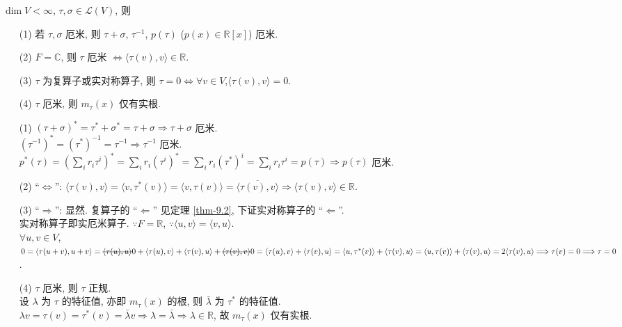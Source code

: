 \documentclass{note}
\begin{document}
\begin{thm}
    $\dim V<\infty$, $\tau,\sigma\in\mathcal{L}(V)$, 则
    \begin{itemize}
        \item[(1)] 若 $\tau,\sigma$ 厄米, 则 $\tau+\sigma$, $\tau^{-1}$, $p(\tau)$ ($p(x)\in\mathbb{R}[x]$) 厄米.
        \item[(2)] $F=\mathbb{C}$, 则 $\tau$ 厄米 $\Longleftrightarrow\langle\tau(v),v\rangle\in\mathbb{R}$.
        \item[(3)] $\tau$ 为复算子或实对称算子, 则 $\tau=0\Longleftrightarrow\forall v\in V$,$\langle\tau(v),v\rangle=0$.
        \item[(4)] $\tau$ 厄米, 则 $m_{\tau}(x)$ 仅有实根.
    \end{itemize}
\end{thm}
\begin{pf}
    \begin{itemize}
        \item[(1)] $(\tau+\sigma)^*=\tau^*+\sigma^*=\tau+\sigma\Longrightarrow\tau+\sigma$ 厄米.\\
        $(\tau^{-1})^*=(\tau^*)^{-1}=\tau^{-1}\Longrightarrow\tau^{-1}$ 厄米.\\
        $p^*(\tau)=\left(\sum_ir_i\tau^i\right)^*=\sum_ir_i(\tau^i)^*=\sum_ir_i(\tau^*)^i=\sum_ir_i\tau^i=p(\tau)\Longrightarrow p(\tau)$ 厄米.
        \item[(2)] ``$\Longleftrightarrow$'': $\langle\tau(v),v\rangle=\langle v,\tau^*(v)\rangle=\langle v,\tau(v)\rangle=\overline{\langle\tau(v),v\rangle}\Longrightarrow\langle\tau(v),v\rangle\in\mathbb{R}$.
        \item[(3)] ``$\Longrightarrow$'': 显然. 复算子的 ``$\Longleftarrow$'' 见定理 \ref{thm-9.2}, 下证实对称算子的 ``$\Longleftarrow$''.\\
        实对称算子即实厄米算子. $\because F=\mathbb{R}$, $\because\langle u,v\rangle=\langle v,u\rangle$.\\
        $\forall u,v\in V$, $0=\langle\tau(u+v),u+v\rangle=\msout{\langle\tau(u),u\rangle}0+\langle\tau(u),v\rangle+\langle\tau(v),u\rangle+\msout{\langle\tau(v),v\rangle}0=\langle\tau(u),v\rangle+\langle\tau(v),u\rangle=\langle u,\tau^*(v)\rangle+\langle\tau(v),u\rangle=\langle u,\tau(v)\rangle+\langle\tau(v),u\rangle=2\langle\tau(v),u\rangle\Longrightarrow\tau(v)=0\Longrightarrow\tau=0$.
        \item[(4)] $\tau$ 厄米, 则 $\tau$ 正规.\\
        设 $\lambda$ 为 $\tau$ 的特征值, 亦即 $m_{\tau}(x)$ 的根, 则 $\bar{\lambda}$ 为 $\tau^*$ 的特征值.\\
        $\lambda v=\tau(v)=\tau^*(v)=\bar{\lambda}v\Longrightarrow\lambda=\bar{\lambda}\Longrightarrow\lambda\in\mathbb{R}$, 故 $m_{\tau}(x)$ 仅有实根.
    \end{itemize}
\end{pf}
\end{document}
